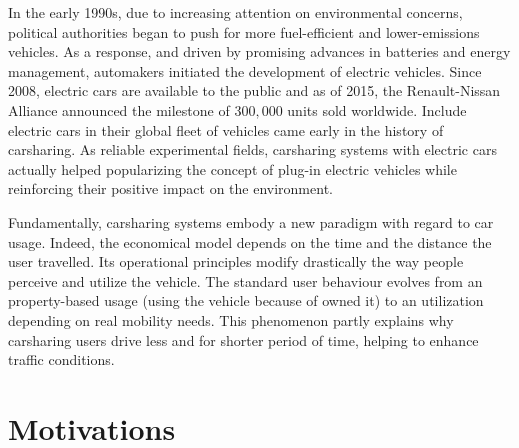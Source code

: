 \begin{bibunit}[ieeetr]
In the early 1990s, due to increasing attention on environmental concerns, political authorities began to push for more fuel-efficient and lower-emissions vehicles.
As a response, and driven by promising advances in batteries and energy management, automakers initiated the development of electric vehicles.
Since 2008, electric cars are available to the public and as of 2015, the Renault-Nissan Alliance announced the milestone of $300,000$ units sold worldwide.
Include electric cars in their global fleet of vehicles came early in the history of carsharing.
As reliable experimental fields, carsharing systems with electric cars actually helped popularizing the concept of plug-in electric vehicles while reinforcing their positive impact on the environment.

\medskip
Fundamentally, carsharing systems embody a new paradigm with regard to car usage.
Indeed, the economical model depends on the time and the distance the user travelled.
Its operational principles modify drastically the way people perceive and utilize the vehicle.
The standard user behaviour evolves from an property-based usage (\ie using the vehicle because of owned it) to an utilization depending on real mobility needs.
This phenomenon partly explains why carsharing users drive less and for shorter period of time, helping to enhance traffic conditions.





\section{Motivations}


\end{bibunit}
